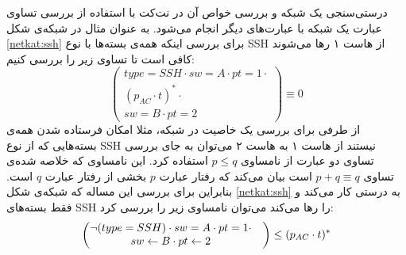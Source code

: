 درستی‌سنجی یک شبکه و بررسی خواص آن در نت‌کت با استفاده از بررسی تساوی عبارت یک شبکه با عبارت‌های دیگر انجام می‌شود.
به عنوان مثال در شبکه‌ی شکل
\ref{netkat:ssh}
برای بررسی اینکه همه‌ی بسته‌ها با نوع
SSH
از هاست ۱ رها می‌شوند کافی است تا تساوی زیر را بررسی کنیم:
\begin{equation}
    \begin{pmatrix}
          type = SSH \cdot sw = A \cdot pt = 1 \cdot \\
          (p_{AC}\cdot t) ^ * \cdot                  \\
          sw = B\cdot pt = 2
    \end{pmatrix}
    \equiv 0
\end{equation}
از طرفی برای بررسی یک خاصیت در شبکه، مثلا امکان فرستاده شدن‌ همه‌ی بسته‌هایی که از نوع
SSH
نیستند از هاست ۱ به هاست ۲
می‌توان به جای بررسی تساوی دو عبارت از نامساوی 
$p \leq q$
استفاده کرد. 
این نامساوی که خلاصه شده‌ی تساوی
$p + q \equiv q$
است بیان می‌کند که رفتار عبارت
$p$
بخشی از رفتار عبارت
$q$
است.
بنابراین برای بررسی این مساله که شبکه‌ی شکل
\ref{netkat:ssh}
به درستی کار می‌کند و فقط بسته‌های 
SSH
را رها می‌کند می‌توان نامساوی زیر را بررسی کرد:
\begin{equation}
    \begin{pmatrix}
          \neg(type = SSH) \cdot sw = A \cdot pt = 1 \cdot &\\
          sw \leftarrow B \cdot pt \leftarrow 2 &
    \end{pmatrix}
    \leq (p_{AC}\cdot t)^ *
\end{equation}
